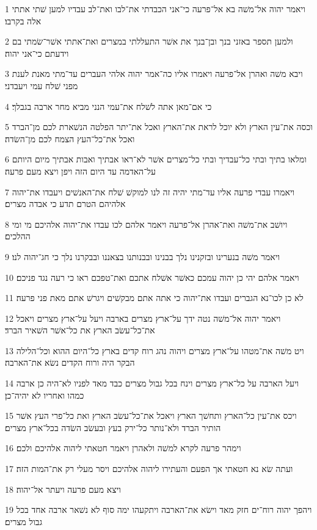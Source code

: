 \par 1 ויאמר יהוה אל־משׁה בא אל־פרעה כי־אני הכבדתי את־לבו ואת־לב עבדיו למען שׁתי אתתי אלה בקרבו׃
\par 2 ולמען תספר באזני בנך ובן־בנך את אשׁר התעללתי במצרים ואת־אתתי אשׁר־שׂמתי בם וידעתם כי־אני יהוה׃
\par 3 ויבא משׁה ואהרן אל־פרעה ויאמרו אליו כה־אמר יהוה אלהי העברים עד־מתי מאנת לענת מפני שׁלח עמי ויעבדני׃
\par 4 כי אם־מאן אתה לשׁלח את־עמי הנני מביא מחר ארבה בגבלך׃
\par 5 וכסה את־עין הארץ ולא יוכל לראת את־הארץ ואכל את־יתר הפלטה הנשׁארת לכם מן־הברד ואכל את־כל־העץ הצמח לכם מן־השׂדה׃
\par 6 ומלאו בתיך ובתי כל־עבדיך ובתי כל־מצרים אשׁר לא־ראו אבתיך ואבות אבתיך מיום היותם על־האדמה עד היום הזה ויפן ויצא מעם פרעה׃
\par 7 ויאמרו עבדי פרעה אליו עד־מתי יהיה זה לנו למוקשׁ שׁלח את־האנשׁים ויעבדו את־יהוה אלהיהם הטרם תדע כי אבדה מצרים׃
\par 8 ויושׁב את־משׁה ואת־אהרן אל־פרעה ויאמר אלהם לכו עבדו את־יהוה אלהיכם מי ומי ההלכים׃
\par 9 ויאמר משׁה בנערינו ובזקנינו נלך בבנינו ובבנותנו בצאננו ובבקרנו נלך כי חג־יהוה לנו׃
\par 10 ויאמר אלהם יהי כן יהוה עמכם כאשׁר אשׁלח אתכם ואת־טפכם ראו כי רעה נגד פניכם׃
\par 11 לא כן לכו־נא הגברים ועבדו את־יהוה כי אתה אתם מבקשׁים ויגרשׁ אתם מאת פני פרעה׃
\par 12 ויאמר יהוה אל־משׁה נטה ידך על־ארץ מצרים בארבה ויעל על־ארץ מצרים ויאכל את־כל־עשׂב הארץ את כל־אשׁר השׁאיר הברד׃
\par 13 ויט משׁה את־מטהו על־ארץ מצרים ויהוה נהג רוח קדים בארץ כל־היום ההוא וכל־הלילה הבקר היה ורוח הקדים נשׂא את־הארבה׃
\par 14 ויעל הארבה על כל־ארץ מצרים וינח בכל גבול מצרים כבד מאד לפניו לא־היה כן ארבה כמהו ואחריו לא יהיה־כן׃
\par 15 ויכס את־עין כל־הארץ ותחשׁך הארץ ויאכל את־כל־עשׂב הארץ ואת כל־פרי העץ אשׁר הותיר הברד ולא־נותר כל־ירק בעץ ובעשׂב השׂדה בכל־ארץ מצרים׃
\par 16 וימהר פרעה לקרא למשׁה ולאהרן ויאמר חטאתי ליהוה אלהיכם ולכם׃
\par 17 ועתה שׂא נא חטאתי אך הפעם והעתירו ליהוה אלהיכם ויסר מעלי רק את־המות הזה׃
\par 18 ויצא מעם פרעה ויעתר אל־יהוה׃
\par 19 ויהפך יהוה רוח־ים חזק מאד וישׂא את־הארבה ויתקעהו ימה סוף לא נשׁאר ארבה אחד בכל גבול מצרים׃
